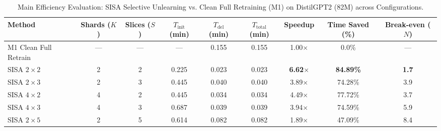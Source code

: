 \begin{table}[t]
\centering
\small
\caption{Main Efficiency Evaluation: SISA Selective Unlearning vs. Clean Full Retraining (M1) on DistilGPT2 (82M) across Configurations.}
\label{tab:efficiency}
\begin{tabular}{lcccccccc}
\toprule
\textbf{Method} & \textbf{Shards ($K$)} & \textbf{Slices ($S$)} & \textbf{$T_{\text{init}}$ (min)} & \textbf{$T_{\text{del}}$ (min)} & \textbf{$T_{\text{total}}$ (min)} & \textbf{Speedup} & \textbf{Time Saved (\%)} & \textbf{Break-even ($N$)} \\
\midrule
M1 Clean Full Retrain & --- & --- & --- & 0.155 & 0.155 & 1.00$\times$ & 0.0\% & --- \\
SISA $2\times2$ & 2 & 2 & 0.225 & 0.023 & 0.023 & \textbf{6.62$\times$} & \textbf{84.89\%} & \textbf{1.7} \\
SISA $2\times3$ & 2 & 3 & 0.445 & 0.040 & 0.040 & 3.89$\times$ & 74.28\% & 3.9 \\
SISA $4\times2$ & 4 & 2 & 0.445 & 0.034 & 0.034 & 4.49$\times$ & 77.72\% & 3.7 \\
SISA $4\times3$ & 4 & 3 & 0.687 & 0.039 & 0.039 & 3.94$\times$ & 74.59\% & 5.9 \\
SISA $2\times5$ & 2 & 5 & 0.614 & 0.082 & 0.082 & 1.89$\times$ & 47.09\% & 8.4 \\
\bottomrule
\end{tabular}
\end{table}
